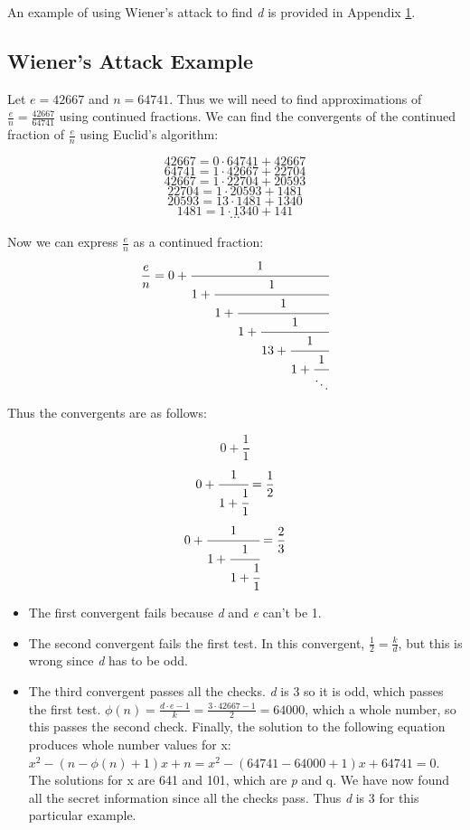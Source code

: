\documentclass[11pt]{article}
\begin{document}
An example of using Wiener's attack to find \emph{d} is provided in Appendix \ref{appendix:example}.



\begin{appendices}
\section{Wiener's Attack Example}
\label{appendix:example}
Let $ e = 42667 $ and $ n = 64741$. Thus we will need to find approximations of $\frac{e}{n} = \frac{42667}{64741}$ using continued fractions. We can find the convergents of the continued fraction of $\frac{e}{n}$ using Euclid's algorithm:

$$ 42667 = 0 \cdot 64741 + 42667 $$
$$ 64741 = 1 \cdot 42667 + 22704 $$
$$ 42667 = 1 \cdot 22704 + 20593 $$
$$ 22704 = 1 \cdot 20593 + 1481 $$
$$ 20593 = 13 \cdot 1481 + 1340 $$
$$ 1481 = 1 \cdot 1340 + 141 $$
$$ \cdots $$

Now we can express $\frac{e}{n}$ as a continued fraction:
$$\frac{e}{n}= 0 + \cfrac{1}{1+\cfrac{1}{1+\cfrac{1}{1+\cfrac{1}{13+\cfrac{1}{1+\cfrac{1}{\ddots}}}}}}$$

Thus the convergents are as follows:

$$ 0 + \frac{1}{1} $$
$$0+\cfrac{1}{1+\cfrac{1}{1}} = \frac{1}{2}$$
$$0+\cfrac{1}{1+\cfrac{1}{1+\cfrac{1}{1}}} = \frac{2}{3} $$
\begin{itemize}
	\item The first convergent fails because \emph{d} and \emph{e} can't be 1.
	\item The second convergent fails the first test. In this convergent, $\frac{1}{2} = \frac{k}{d}$, but this is wrong since \emph{d} has to be odd.
\item The third convergent passes all the checks. \emph{d} is 3 so it is odd, which passes the first test. $\phi(n) = \frac{ d \cdot e - 1}{k} = \frac{3 \cdot 42667 - 1}{2} = 64000$, which a whole number, so this passes the second check. Finally, the solution to the following equation produces whole number values for x: $ x^2 - (n - \phi(n) + 1)x + n = x^2 - (64741 - 64000 + 1)x + 64741 = 0$. The solutions for x are 641 and 101, which are \emph{p} and {q}. We have now found all the secret information since all the checks pass. Thus \emph{d} is $3$ for this particular example.
\end{itemize}


\end{appendices}
\end{document}
